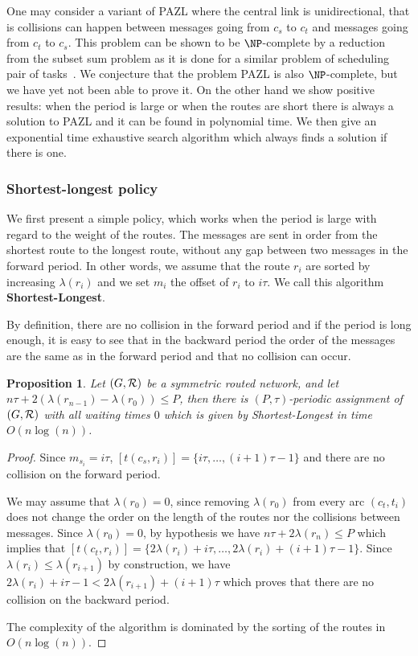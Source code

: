 \documentclass[a4paper,10pt]{article}
\newtheorem{proposition}{Proposition}
\begin{document}
  
  One may consider a variant of PAZL where the central link is unidirectional, that is collisions can happen between messages going from $c_s$ to $c_t$ and messages  going from $c_t$ to $c_s$. This problem can be shown to be $\NP$-complete by a reduction from the subset sum problem as it is done for a similar problem of scheduling pair of tasks~\cite{orman1997complexity}. We conjecture that the problem PAZL is also $\NP$-complete,  but we have yet not been able to prove it.
  On the other hand we show positive results:  when the period is large or when the routes are short there is always a solution to PAZL and it can be found in polynomial time. We then give an exponential time exhaustive search algorithm which always finds a solution if there is one. 
  
    \subsubsection*{Shortest-longest policy}
    

    We first present a simple policy, which works when the period is large with regard to the weight of the routes.
    The messages are sent in order from the shortest route to the longest route, without any gap between two messages in the forward period.
    In other words, we assume that the route $r_i$ are sorted by increasing $\lambda(r_i)$ and we set $m_{i}$ the offset of $r_i$ to $i\tau$. We call this algorithm {\bf Shortest-Longest}.
      
     By definition, there are no collision in the forward period and if the period is long enough, 
     it is easy to see that in the backward period the order of the messages are the same as in the forward period and that no collision can occur. 
      
      
      \begin{proposition} Let $(G, {\cal R})$ be a symmetric routed network, and let $n\tau + 2(\lambda(r_{n-1}) - \lambda(r_{0})) \leq P$, then there is $(P,\tau)$-periodic assignment of $(G, {\cal R})$ with all waiting times $0$ which is given by Shortest-Longest in time $O(n\log(n))$.\label{prop:SL}
      \end{proposition}
      \begin{proof}
       Since $m_{s_i} = i\tau$, $[t(c_s,r_{i})] = \{i\tau,\dots, (i+1)\tau -1\}$ and there are no collision on the forward period.
       
       
       We may assume that $\lambda(r_{0}) = 0$, since removing $\lambda(r_{0})$ from every arc $(c_t,t_i)$ does not change the order on the length of the routes nor the collisions between messages.
       Since $\lambda(r_{0}) = 0$, by hypothesis we have $n\tau + 2\lambda(r_{n}) \leq P$ which implies that
       $[t(c_t,r_{i})] = \{2 \lambda(r_{i}) + i\tau, \dots,  2 \lambda(r_{i}) + (i+1)\tau -1\}$.
       Since $ \lambda(r_{i}) \leq  \lambda(r_{i+1})$ by construction, we have  $2 \lambda(r_{i}) + i\tau -1 < 2 \lambda(r_{i+1}) + (i+1)\tau$ which proves that there are no collision on the backward period. 
       
       The complexity of the algorithm is dominated by the sorting of the routes in $O(n\log(n))$. 
      \end{proof}
\end{document}
